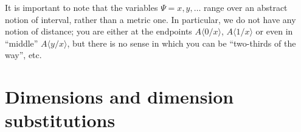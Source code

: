 \documentclass{article}
\newcommand\DimSubst[3]{#3\langle{#1}/{#2}\rangle}
\begin{document}
It is important to note that the variables $\Psi=x,y,\ldots$ range
over an abstract notion of interval, rather than a metric one. In
particular, we do not have any notion of distance; you are either at
the endpoints $\DimSubst{0}{x}{A}$, $\DimSubst{1}{x}{A}$ or even in
``middle'' $\DimSubst{y}{x}{A}$, but there is no sense in which you
can be ``two-thirds of the way'', etc.






\newif\ifannots
\annotstrue

\newcommand{\jonathan}[1]{{\ifannots {\color{red} [\,#1\,]} \fi}}
\newcommand{\colored}[1]{{\color{blue} #1}}

\newcommand{\isDim}[2]{#1 \,\vdash\, #2 \;\mathsf{dim}}
\newcommand{\isTm}[2]{#1 \; \mathsf{tm} \; [#2]}
\newcommand{\EmptyDimCtx}[0]{\emptyset}

\newcommand{\stepDim}[3]{\ensuremath{#1 \mapsto_{#3} #2}}
\newcommand{\evalDim}[3]{\ensuremath{#1 \mathrel{\Downarrow}^{#3}\! #2}}
\newcommand{\valueDim}[2]{\ensuremath{#1\;\mathsf{value}_{#2}}}

\newcommand{\InTypeDim}[3]{#1 \in #2 \; [#3]}
\newcommand{\EqInTypeDim}[4]{#1 \doteq #2 \in #3 \; [#4]}


\section{Dimensions and dimension substitutions}
\end{document}
